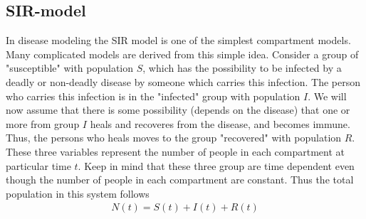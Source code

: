 \documentclass[a4paper, 10pt]{article}
\begin{document}
\subsection{SIR-model\label{sec:SIR}} In disease modeling the SIR model is one of the simplest
compartment models. Many complicated models are derived from this simple idea.
Consider a group of "susceptible" with population $S$, which has the possibility to be infected by a deadly or non-deadly
disease by someone which carries this infection. The person who carries this infection is in the "infected" group with population $I$.
We will now assume that there is some possibility (depends on the disease) that one or more from group $I$
heals and recoveres from the disease, and becomes immune. Thus, the persons who heals moves to the group "recovered" with population $R$.
These three variables represent the number of people in each compartment at particular time $t$. Keep in mind
that these three group are time dependent even though the number of people in each
compartment are constant. Thus the total population in this system follows
\begin{align}
  N(t) = S(t) + I(t) + R(t)
\end{align}
\end{document}
